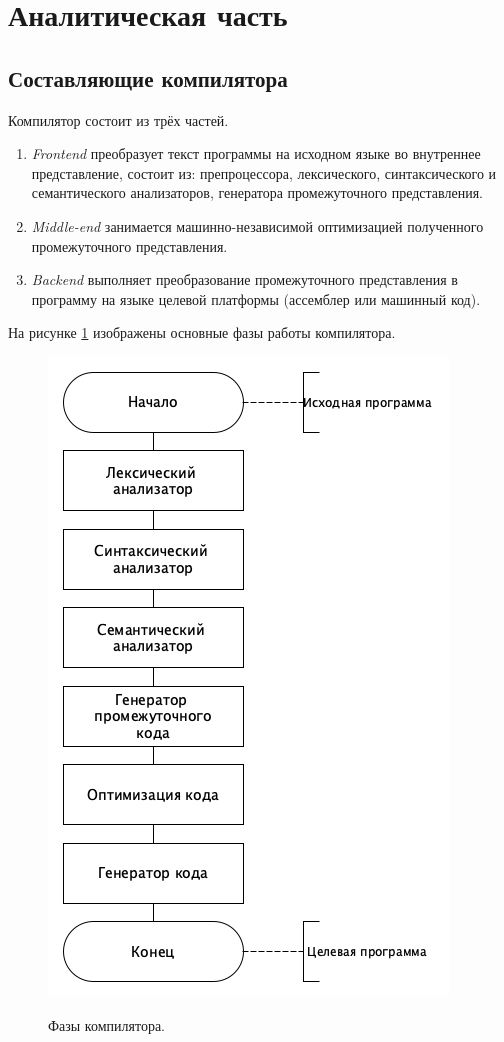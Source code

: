 \section{Аналитическая часть}

\subsection{Составляющие компилятора}
Компилятор состоит из трёх частей.
\begin{enumerate}
	\item \textit{Frontend} преобразует текст программы на исходном языке во внутреннее представление, состоит из: препроцессора, лексического, синтаксического и семантического анализаторов, генератора промежуточного представления.  
	
	\item \textit{Middle-end} занимается машинно-независимой оптимизацией полученного промежуточного представления.
	
	\item \textit{Backend} выполняет преобразование промежуточного представления в программу на языке целевой платформы (ассемблер или машинный код).
\end{enumerate}

На рисунке \ref{fig:phases} изображены основные фазы работы компилятора.

\begin{figure}[h!]
	\begin{center}
		{\includegraphics[scale = 0.55, page=1]{img/phases.png}}
		\caption{Фазы компилятора.}
		\label{fig:phases}
	\end{center}
\end{figure}

